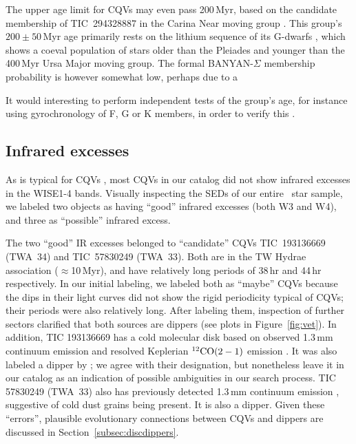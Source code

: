 \documentclass[11pt,twocolumn,tighten]{aastex63}
\begin{document}
The upper age limit for CQVs may even pass 200\,Myr, based on the
candidate membership of TIC~294328887 in the Carina Near moving group
\citep{2006ApJ...649L.115Z}.  This group's $200 \pm 50$\,Myr age
primarily rests on the lithium sequence of its G-dwarfs
\citep{2006ApJ...649L.115Z}, which shows a coeval population of stars
older than the Pleiades and younger than the 400\,Myr Ursa Major
moving group.  The formal BANYAN-$\Sigma$ membership probability is
however somewhat low, perhaps due to a 

It would interesting to perform independent tests of
the group's age, for instance using gyrochronology of F, G or K
members, in order to verify this .




\subsection{Infrared excesses}
\label{subsec:irexcess}

As is typical for CQVs \citep{2017AJ....153..152S}, most CQVs in our
catalog did not show infrared excesses in the WISE1-4 bands.
Visually inspecting the SEDs of our entire \ncpvsfound\ star sample,
we labeled two objects as having ``good'' infrared excesses (both W3
and W4), and three as ``possible'' infrared excess.

The two ``good'' IR excesses belonged to ``candidate'' CQVs
TIC~193136669 (TWA~34) and TIC~57830249 (TWA~33).  Both are in the TW
Hydrae association ($\approx$10\,Myr), and have relatively long
periods of 38\,hr and 44\,hr respectively.  In our initial labeling,
we labeled both as ``maybe'' CQVs because the dips in their light
curves did not show the rigid periodicity typical of CQVs;  their
periods were also relatively long.  After labeling them, inspection
of further sectors clarified that both sources are dippers (see plots
in Figure~\ref{fig:vet}).  In addition, TIC 193136669 has a cold
molecular disk based on observed 1.3\,mm continuum emission and
resolved Keplerian $^{12}{\rm CO}(2-1)$ emission
\citep{2015A&A...582L...5R}.  It was also labeled a dipper by
\citet{2022ApJS..263...14C}; we agree with their designation, but
nonetheless leave it in our catalog as an indication of possible
ambiguities in our search process.  TIC 57830249 (TWA~33) also has
previously detected 1.3\,mm continuum emission
\citep{2015A&A...582L...5R}, suggestive of cold dust grains being
present.  It is also a dipper.
Given these ``errors'', plausible evolutionary connections between CQVs and
dippers are discussed in Section~\ref{subsec:discdippers}.
\end{document}
